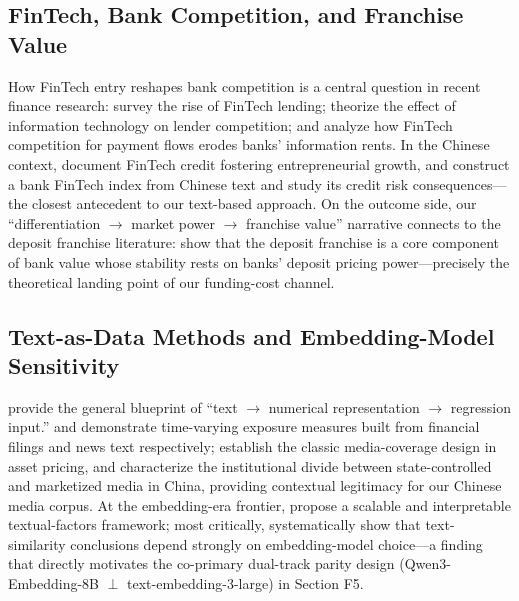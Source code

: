 \subsection{FinTech, Bank Competition, and Franchise Value}
How FinTech entry reshapes bank competition is a central question in
recent finance research: \textcite{berg2022fintechlending} survey the
rise of FinTech lending; \textcite{vives2025lendercompetition}
theorize the effect of information technology on lender competition;
and \textcite{parlour2022payments} analyze how FinTech competition for
payment flows erodes banks' information rents. In the Chinese
context, \textcite{hau2024fintechcredit} document FinTech credit
fostering entrepreneurial growth, and \textcite{cheng2020bankfintech}
construct a bank FinTech index from Chinese text and study its credit
risk consequences---the closest antecedent to our text-based
approach. On the outcome side, our
``differentiation $\to$ market power $\to$ franchise value''
narrative connects to the deposit franchise literature:
\textcite{drechsler2026franchise} show that the deposit franchise is
a core component of bank value whose stability rests on banks'
deposit pricing power---precisely the theoretical landing point of
our funding-cost channel.

\subsection{Text-as-Data Methods and Embedding-Model Sensitivity}
\textcite{gentzkow2019text} provide the general blueprint of
``text $\to$ numerical representation $\to$ regression input.''
\textcite{hanley2019dynamic} and \textcite{engle2020climatenews}
demonstrate time-varying exposure measures built from financial
filings and news text respectively; \textcite{fang2009media}
establish the classic media-coverage design in asset pricing, and
\textcite{you2018pen} characterize the institutional divide between
state-controlled and marketized media in China, providing contextual
legitimacy for our Chinese media corpus. At the embedding-era
frontier, \textcite{cong2024textualfactors} propose a scalable and
interpretable textual-factors framework; most critically,
\textcite{ganguli2024patenttext} systematically show that
text-similarity conclusions depend strongly on embedding-model
choice---a finding that directly motivates the co-primary dual-track
parity design (Qwen3-Embedding-8B $\perp$ text-embedding-3-large) in
Section F5.

